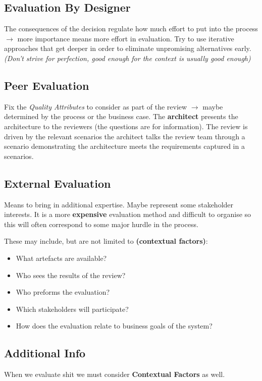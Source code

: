 \documentclass[a4paper]{article}
\begin{document}
\subsection{Evaluation By Designer}
The consequences of the decision regulate how much effort to put into the process $\rightarrow$ more importance means more effort in evaluation. Try to use iterative approaches that get deeper in order to eliminate unpromising alternatives early. \textit{(Don't strive for perfection, good enough for the context is usually good enough)}

\subsection{Peer Evaluation}
Fix the \textit{Quality Attributes} to consider as part of the review $\rightarrow$  maybe determined by the process or the business case. The \textbf{architect} presents the architecture to the reviewers (the questions are for information). The review is driven by the relevant scenarios the architect talks the review team through a scenario demonstrating the architecture meets the requirements captured in a scenarios.

\subsection{External Evaluation}
Means to bring in additional expertise. Maybe represent some stakeholder interests. It is a more \textbf{expensive} evaluation method and difficult to organise so this will often correspond to some major hurdle in the process.


These may include, but are not limited to \textbf{(contextual factors)}:
\begin{itemize}
\item What artefacts are available?
\item Who sees the results of the review?
\item Who preforms the evaluation?
\item Which stakeholders will participate?
\item How does the evaluation relate to business goals of the system?
\end{itemize}


\subsection{Additional Info}

When we evaluate shit we must consider \textbf{Contextual Factors} as well.
\end{document}
